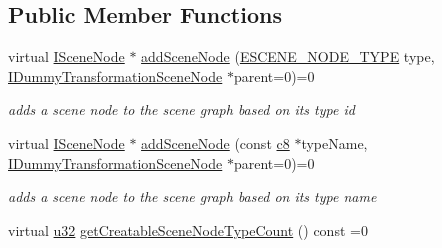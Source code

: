 \subsection*{Public Member Functions}
\begin{DoxyCompactItemize}
\item 
virtual \hyperlink{classirr_1_1scene_1_1ISceneNode}{I\+Scene\+Node} $\ast$ \hyperlink{classirr_1_1scene_1_1ISceneNodeFactory_ac048c44d17c837c63adc42d02c4e865a}{add\+Scene\+Node} (\hyperlink{namespaceirr_1_1scene_acad3d7ef92a9807d391ba29120f3b7bd}{E\+S\+C\+E\+N\+E\+\_\+\+N\+O\+D\+E\+\_\+\+T\+Y\+PE} type, \hyperlink{classirr_1_1scene_1_1IDummyTransformationSceneNode}{I\+Dummy\+Transformation\+Scene\+Node} $\ast$parent=0)=0
\begin{DoxyCompactList}\small\item\em adds a scene node to the scene graph based on its type id \end{DoxyCompactList}\item 
virtual \hyperlink{classirr_1_1scene_1_1ISceneNode}{I\+Scene\+Node} $\ast$ \hyperlink{classirr_1_1scene_1_1ISceneNodeFactory_ab12162d09e0ee3b20a4f15853692a194}{add\+Scene\+Node} (const \hyperlink{namespaceirr_a9395eaea339bcb546b319e9c96bf7410}{c8} $\ast$type\+Name, \hyperlink{classirr_1_1scene_1_1IDummyTransformationSceneNode}{I\+Dummy\+Transformation\+Scene\+Node} $\ast$parent=0)=0
\begin{DoxyCompactList}\small\item\em adds a scene node to the scene graph based on its type name \end{DoxyCompactList}\item 
virtual \hyperlink{namespaceirr_a0416a53257075833e7002efd0a18e804}{u32} \hyperlink{classirr_1_1scene_1_1ISceneNodeFactory_a9bddacbed34d9d433c1d9075c71410eb}{get\+Creatable\+Scene\+Node\+Type\+Count} () const  =0\hypertarget{classirr_1_1scene_1_1ISceneNodeFactory_a9bddacbed34d9d433c1d9075c71410eb}{}\label{classirr_1_1scene_1_1ISceneNodeFactory_a9bddacbed34d9d433c1d9075c71410eb}


\end{DoxyCompactItemize}
